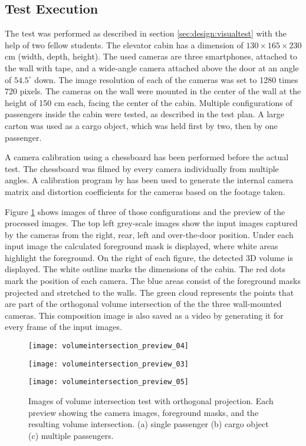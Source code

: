 \subsection{Test Execution}
The test was performed as described in section \ref{sec:design:visualtest} with the help of two fellow students.
The elevator cabin has a dimension of $ 130 \times 165 \times 230 $ cm (width, depth, height).
The used cameras are three smartphones, attached to the wall with tape, and a wide-angle camera attached above the door at an angle of $ 54.5^{\circ} $ down.
The image resolution of each of the cameras was set to 1280 times 720 pixels.
The cameras on the wall were mounted in the center of the wall at the height of 150 cm each, facing the center of the cabin.
Multiple configurations of passengers inside the cabin were tested, as described in the test plan.
A large carton was used as a cargo object, which was held first by two, then by one passenger.

A camera calibration using a chessboard has been performed before the actual test.
The chessboard was filmed by every camera individually from multiple angles.
A calibration program by \textcite{smid2015calibration} has been used to generate the internal camera matrix and distortion coefficients for the cameras based on the footage taken.

Figure \ref{fig:impl:videopreview} shows images of three of those configurations and the preview of the processed images.
The top left grey-scale images show the input images captured by the cameras from the right, rear, left and over-the-door position.
Under each input image the calculated foreground mask is displayed, where white areas highlight the foreground.
On the right of each figure, the detected \ac{3D} volume is displayed.
The white outline marks the dimensions of the cabin.
The red dots mark the position of each camera.
The blue areas consist of the foreground masks projected and stretched to the walls.
The green cloud represents the points that are part of the orthogonal volume intersection of the 
the three wall-mounted cameras.
This composition image is also saved as a video by generating it for every frame of the input images.

\begin{figure}[p]
    \centering
    \texttt{[image: volumeintersection\_preview\_04]}
    
    \vspace{0.5em}
    
    \texttt{[image: volumeintersection\_preview\_03]}
    
    \vspace{0.5em}
    
    \texttt{[image: volumeintersection\_preview\_05]}
    
    \caption[Images of volume intersection test with orthogonal projection]{Images of volume intersection test with orthogonal projection. Each preview showing the camera images, foreground masks, and the resulting volume intersection. (a) single passenger (b) cargo object (c) multiple passengers.}
    \label{fig:impl:videopreview}
\end{figure}

